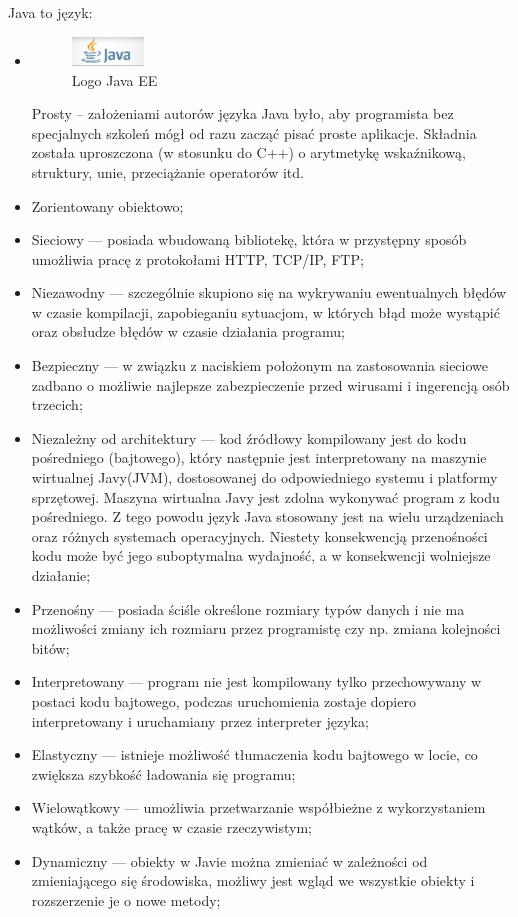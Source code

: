 \documentclass[eng,printmode,oneside]{mgr}
\begin{document}
Java to język:

\begin{itemize}
  \item  \parbox[t]{\dimexpr\textwidth-\leftmargin}{
      \vspace{-2.5mm}
    \begin{figure}
	\centering
	\includegraphics[width=0.18\textwidth]{javaEE.png}
	\caption{\label{fig:javaEE}Logo Java EE \cite{java.oracle.ee}}
	\end{figure}
  Prosty -- założeniami autorów języka Java było, aby programista bez
  specjalnych szkoleń mógł od razu zacząć pisać proste aplikacje. Składnia
  została uproszczona (w stosunku do C++) o arytmetykę wskaźnikową, struktury,
  unie, przeciążanie operatorów itd. 
	}
  \item Zorientowany obiektowo;
  \item Sieciowy --- posiada wbudowaną bibliotekę, która w przystępny sposób
  umożliwia pracę z protokołami HTTP, TCP/IP, FTP;
  \item Niezawodny --- szczególnie skupiono się na wykrywaniu ewentualnych
  błędów w czasie kompilacji, zapobieganiu sytuacjom, w których błąd może
  wystąpić oraz obsłudze błędów w czasie działania programu;
  \item Bezpieczny --- w związku z naciskiem położonym na zastosowania sieciowe
  zadbano o możliwie najlepsze zabezpieczenie przed wirusami i ingerencją osób
  trzecich;
  \item Niezależny od architektury --- kod źródłowy kompilowany jest do kodu
  pośredniego (bajtowego), który następnie jest interpretowany na maszynie
  wirtualnej Javy(JVM), dostosowanej do odpowiedniego systemu i platformy sprzętowej. Maszyna
  wirtualna Javy jest zdolna wykonywać program z kodu pośredniego. Z tego powodu język Java
  stosowany jest na wielu urządzeniach oraz różnych systemach operacyjnych.
  Niestety konsekwencją przenośności kodu może być jego suboptymalna
  wydajność, a w konsekwencji wolniejsze działanie;
  \item Przenośny --- posiada ściśle określone rozmiary typów danych i nie ma
  możliwości zmiany ich rozmiaru przez programistę czy np.
  zmiana kolejności bitów;
  \item Interpretowany --- program nie jest kompilowany tylko przechowywany w
  postaci kodu bajtowego, podczas uruchomienia zostaje dopiero interpretowany i
  uruchamiany przez interpreter języka;
  \item Elastyczny --- istnieje możliwość tłumaczenia kodu bajtowego w locie,
  co zwiększa szybkość ładowania się programu;
  \item Wielowątkowy --- umożliwia przetwarzanie współbieżne z wykorzystaniem
  wątków, a także pracę w czasie rzeczywistym;
  \item Dynamiczny --- obiekty w Javie można zmieniać w zależności od
  zmieniającego się środowiska, możliwy jest wgląd we wszystkie obiekty i
  rozszerzenie je o nowe metody;
\end{itemize}
\end{document}
